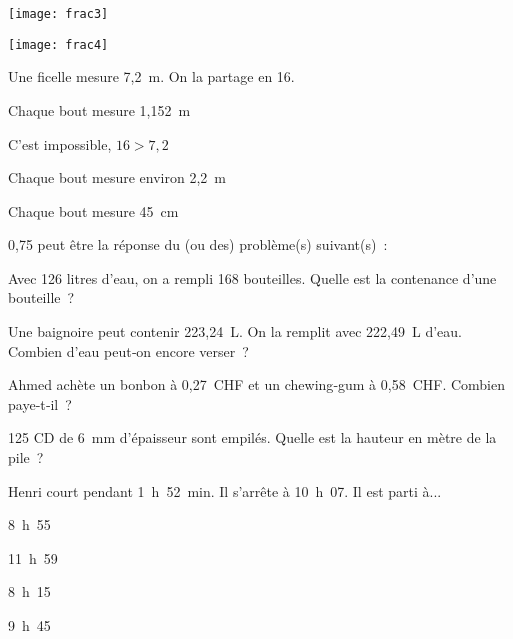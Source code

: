 \begin{QCM}
\begin{GroupeQCM}
\begin{exercice}
\begin{ChoixQCM}{4}
      \texttt{[image: frac3]}
      \item 
      
      \texttt{[image: frac4]}
      \end{ChoixQCM}
      \begin{corrige}
   \end{corrige}
    \end{exercice}

    
     \begin{exercice}
      Une ficelle mesure 7,2 m. On la partage en 16.
      \begin{ChoixQCM}{4}
      \item Chaque bout mesure 1,152 m
      \item C'est impossible, $16 > 7,2$
      \item Chaque bout mesure environ 2,2 m
      \item Chaque bout mesure 45 cm
      \end{ChoixQCM}
      \begin{corrige}
   \end{corrige}
    \end{exercice}
    
    \begin{exercice}
      0,75 peut être la réponse du (ou des) problème(s) suivant(s) :
      \begin{ChoixQCM}{4}
      \item Avec 126 litres d'eau, on a rempli 168 bouteilles. Quelle est la contenance d'une bouteille ?
      \item Une baignoire peut contenir 223,24 L. On la remplit avec  222,49 L d'eau. Combien d'eau peut‑on encore verser ?
      \item Ahmed achète un bonbon à 0,27 CHF et un chewing‑gum à 0,58 CHF. Combien paye‑t‑il ?
      \item 125 CD de 6 mm d'épaisseur sont empilés. Quelle est la hauteur en mètre de la pile ?
      \end{ChoixQCM}
      \begin{corrige}
   \end{corrige}
    \end{exercice}
    
    \begin{exercice}
      Henri court pendant 1 h 52 min. Il s'arrête à 10 h 07. Il est parti à...
      \begin{ChoixQCM}{4}
      \item 8 h 55
      \item 11 h 59
      \item 8 h 15
      \item 9 h 45
      \end{ChoixQCM}
      \begin{corrige}
   \end{corrige}
    \end{exercice}

\end{GroupeQCM}
\end{QCM}

  
